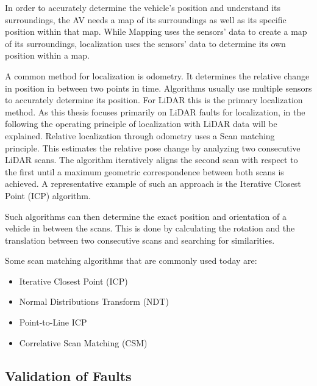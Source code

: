 In order to accurately determine the vehicle's position and understand its surroundings, the AV needs a map of its surroundings as well as its specific position within that map. While Mapping uses the sensors' data to create a map of its surroundings, localization uses the sensors' data to determine its own position within a map.



A common method for localization is odometry. It determines the relative change in position in between two points in time. Algorithms usually use multiple sensors to accurately determine its position. 
For LiDAR this is the primary localization method. 
As this thesis focuses primarily on LiDAR faults for localization, in the following the operating principle of localization with LiDAR data will be explained. 
Relative localization through odometry uses a Scan matching principle. This estimates the relative pose change by analyzing two consecutive LiDAR scans. The algorithm iteratively aligns the second scan with respect to the first until a maximum geometric correspondence between both scans is achieved. A representative example of such an approach is the Iterative Closest Point (ICP) algorithm.

Such algorithms can then determine the exact position and orientation of a vehicle in between the scans. This is done by calculating the rotation and the translation between two consecutive scans and searching for similarities. 

Some scan matching algorithms that are commonly used today are: 
\begin{itemize}
    \item Iterative Closest Point (ICP)
    \item Normal Distributions Transform (NDT)
    \item Point-to-Line ICP
    \item Correlative Scan Matching (CSM)
\end{itemize}


\subsection{Validation of Faults}

